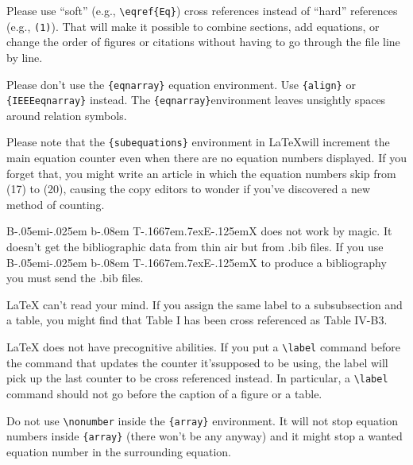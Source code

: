 \documentclass[journal]{IEEEtran}
\def\BibTeX{{\rm B\kern-.05em{\sc i\kern-.025em b}\kern-.08em
    T\kern-.1667em\lower.7ex\hbox{E}\kern-.125emX}}
\begin{document}
Please use ``soft'' (e.g., \verb|\eqref{Eq}|) cross references instead of ``hard'' references (e.g., \verb|(1)|). 
That will make it possible to combine sections, add equations, or change the order of figures or citations without having to go through the file line by line.

Please don't use the \verb|{eqnarray}| equation environment. 
Use \verb|{align}| or \verb|{IEEEeqnarray}| instead. 
The \verb|{eqnarray}|environment leaves unsightly spaces around relation symbols.

Please note that the \verb|{subequations}| environment in {\LaTeX}will increment the main equation counter even when there are no equation numbers displayed. 
If you forget that, you might write an article in which the equation numbers skip from (17) to (20), causing the copy editors to wonder if you've discovered a new method of counting.

{\BibTeX} does not work by magic. 
It doesn't get the bibliographic data from thin air but from .bib files. 
If you use {\BibTeX} to produce a bibliography you must send the .bib files. 

{\LaTeX} can't read your mind. 
If you assign the same label to a subsubsection and a table, you might find that Table I has been cross referenced as Table IV-B3. 

{\LaTeX} does not have precognitive abilities. 
If you put a \verb|\label| command before the command that updates the counter it'ssupposed to be using, the label will pick up the last counter to be cross referenced instead. 
In particular, a \verb|\label| command should not go before the caption of a figure or a table.

Do not use \verb|\nonumber| inside the \verb|{array}| environment. 
It will not stop equation numbers inside \verb|{array}| (there won't be any anyway) and it might stop a wanted equation number in the surrounding equation.
\end{document}

